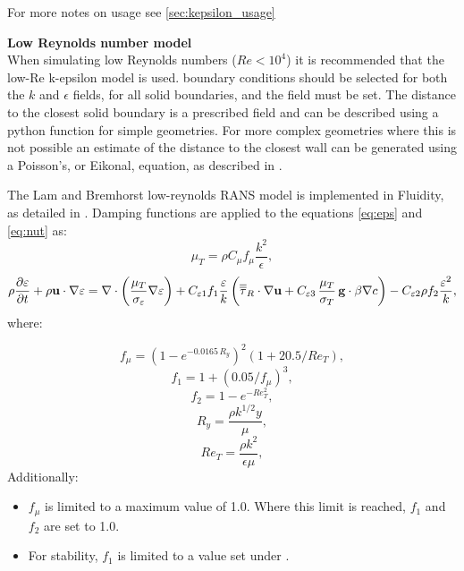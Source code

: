 For more notes on usage see \ref{sec:kepsilon_usage}

\par{\textbf{Low Reynolds number model}\\}
When simulating low Reynolds numbers ($Re<10^4$) it is recommended that the low-Re
k-epsilon model is used. 
boundary conditions should be selected for both the $k$ and $\epsilon$ fields, for all
solid boundaries, and the  field must be set. The distance to the
closest solid boundary is a prescribed field and can be described using a python function
for simple geometries. For more complex geometries where this is not possible an estimate
of the distance to the closest wall can be generated using a Poisson's, or Eikonal,
equation, as described in \citet{Tucker2011}.

The Lam and Bremhorst low-reynolds RANS model is implemented in Fluidity, as detailed in
\citet{wilcox1998turbulence}. Damping functions are applied to the equations \ref{eq:eps}
and \ref{eq:nut} as:
\begin{equation}\label{eq:nut_lowRe}
  \mu_T = \rho C_\mu f_\mu \frac{k^2}{\epsilon},
\end{equation}
\begin{equation}\label{eq:eps_lowRe}
  \rho\frac{\partial \varepsilon}{\partial t} + \rho\mathbf{u}\cdot\nabla \varepsilon = \nabla\cdot\left(\frac{\mu_T}{\sigma_\varepsilon} \nabla{\varepsilon} \right) + C_{\varepsilon1} f_1 \frac{\varepsilon}{k} \left( \overline{\overline{\tau}}_R \cdot \nabla\mathbf{u} + C_{\varepsilon3} \, \frac{\mu_T}{\sigma_T} \, \mathbf{g}\cdot \beta \nabla c \right)- C_{\varepsilon2} \rho f_2 \frac{\varepsilon^2}{k},
\end{equation}
where:

\begin{equation}\label{eq:f_mu}
  f_\mu = \left( 1 - e^{-0.0165 \, R_y} \right)^2 \left( 1 + 20.5/Re_T \right),
\end{equation}
\begin{equation}\label{eq:f_1}
  f_1 = 1 + \left( 0.05/f_\mu \right)^3,
\end{equation}
\begin{equation}\label{eq:f_2}
  f_2 = 1 - e^{-Re_T^2},
\end{equation}
\begin{equation}\label{eq:R_y}
  R_y = \frac{\rho k^{1/2}y}{\mu},
\end{equation}
\begin{equation}\label{eq:Re_T}
  Re_T = \frac{\rho k^2}{\epsilon \mu},
\end{equation}
Additionally:
\begin{itemize}
\item $f_\mu$ is limited to a maximum value of 1.0. Where this limit is reached, $f_1$ and
  $f_2$ are set to 1.0.
\item For stability, $f_1$ is limited to a value set under
  .
\end{itemize}

